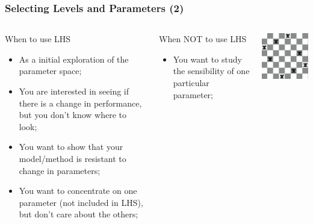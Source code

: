 \documentclass[10pt]{beamer}
\begin{document}
\begin{frame}
  \frametitle{Selecting Levels and Parameters (2)}
  \begin{columns}[c]
    \begin{block}{When to use LHS}
      \begin{itemize}
      \item As a initial exploration of the parameter space;
      \item You are interested in seeing if there is a change in
        performance, but you don't know where to look;
      \item You want to show that your model/method is resistant to
        change in parameters;
      \item You want to concentrate on one parameter (not included in
        LHS), but don't care about the others;
      \end{itemize}
    \end{block}
    \begin{block}{When NOT to use LHS}
      \begin{itemize}
      \item You want to study the sensibility of one particular
        parameter;
      \end{itemize}
    \end{block}
    \includegraphics[width=1\textwidth]{img/lhs_chess}
  \end{columns}
\end{frame}
\end{document}
